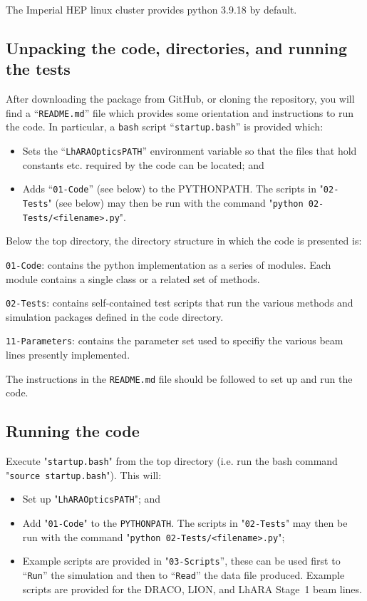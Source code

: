 The Imperial HEP linux cluster provides python 3.9.18 by default.

\subsection*{Unpacking the code, directories, and running the tests}
After downloading the package from GitHub, or cloning the repository,
you will find a ``\verb+README.md+'' file which provides some orientation
and instructions to run the code.
In particular, a \verb+bash+ script ``\verb+startup.bash+'' is
provided which:
\begin{itemize}
  \item Sets the ``\verb+LhARAOpticsPATH+'' environment variable
    so that the files that hold constants etc. required by the code
    can be located; and
  \item Adds ``\verb+01-Code+'' (see below) to the PYTHONPATH.
    The scripts in "\verb+02-Tests+" (see below) may then be run with
    the command "\verb+python 02-Tests/<filename>.py+".
\end{itemize}
Below the top directory, the directory structure in which the code is
presented is:
\begin{description}
  \item\verb+01-Code+: contains the python implementation as a
    series of modules.
    Each module contains a single class or a related set of methods.
  \item\verb+02-Tests+: contains self-contained test scripts that
    run the various methods and simulation packages defined in the
    code directory.
  \item\verb+11-Parameters+: contains the parameter set used to 
    specifiy the various beam lines presently implemented.
\end{description}
The instructions in the \verb+README.md+ file should be followed to set
up and run the code.

\subsection*{Running the code}
Execute "\verb+startup.bash+" from the top directory (i.e. run the
bash command "\verb+source startup.bash+").  This will:
\begin{itemize}
  \item Set up "\verb+LhARAOpticsPATH+"; and
  \item Add "\verb+01-Code+" to the \verb+PYTHONPATH+.
    The scripts in "\verb+02-Tests+" may then be run with the command
    "\verb+python 02-Tests/<filename>.py+"; 
  \item Example scripts are provided in "\verb+03-Scripts+'', these
    can be used first to ``\verb+Run+'' the simulation and then to
    ``\verb+Read+'' the data file produced.
    Example scripts are provided for the DRACO, LION, and LhARA
    Stage~1 beam lines.
\end{itemize}
